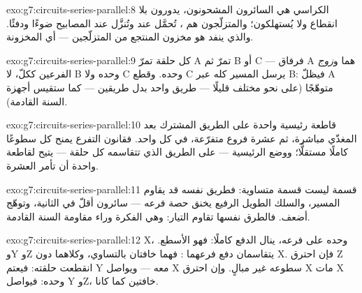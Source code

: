 \begin{solution}{exo:g7:circuits-series-parallel:8}
الكراسي هي السائرون المشحونون، يدورون بلا انقطاع ولا يُستهلكون؛
والمتزلّجون هم ، تُحمَّل عند  وتُنزَّل عند
المصابيح ضوءًا ودفئًا. والذي ينفد هو مخزون المنتجع من
المتزلّجين --- أي   المخزونة.
\end{solution}

\begin{solution}{exo:g7:circuits-series-parallel:9}
كل حلقة تمرّ  A تمرّ  ثم  B أو
 C --- فرفاق A  هما  و\emph{زوج} الفرعين ككلّ، لا B وحده ولا C
وحده. وقطع  C يرسل المسير كله عبر B: فيظلّ A متوهّجًا (على
نحو مختلف قليلًا --- طريق واحد بدل طريقين --- كما ستقيس أجهزة
السنة القادمة).
\end{solution}

\begin{solution}{exo:g7:circuits-series-parallel:10}
قاطعة رئيسية واحدة على الطريق المشترك بعد المغذّي مباشرة، ثم
عشرة فروع متفرّعة، في كل   واحد. فقانون التفرع يمنح كل
 سطوعًا كاملًا مستقلًّا؛ ووضع  الرئيسية 
--- على الطريق الذي تتقاسمه كل حلقة --- يتيح لقاطعة واحدة أن
تأمر العشرة.
\end{solution}

\begin{solution}{exo:g7:circuits-series-parallel:11}
قسمة  ليست قسمة متساوية: فطريق  نفسه قد يقاوم
المسير، والسلك الطويل الرفيع يخنق حصة فرعه --- سائرون أقلّ في
الثانية، وتوهّج أضعف. فالطرق نفسها تقاوم التيار: وهي الفكرة
وراء مقاومة السنة القادمة.
\end{solution}

\begin{solution}{exo:g7:circuits-series-parallel:12}
X، وحده على فرعه، ينال الدفع كاملًا: فهو الأسطع. وY وZ يتقاسمان
دفع فرعهما : فهما خافتان بالتساوي، وكلاهما دون X.
فإن احترق Z انقطعت حلقته: فيعتم Y معه --- ويواصل X سطوعه غير
مبالٍ. وإن احترق X مات  X وحده: فيواصل Y وZ، خافتين كما
كانا.
\end{solution}

